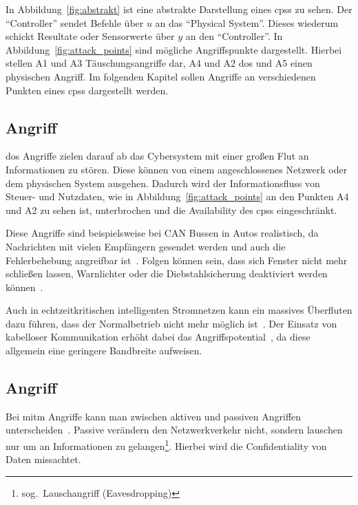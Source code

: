\documentclass[final,bibliography=totocnumbered]{include/sikseminar}
\newcommand{\cps}{\glspl{cps}\xspace}
\begin{document}
In Abbildung~\ref{fig:abstrakt} ist eine abstrakte Darstellung eines \cps zu sehen.
Der \enquote{Controller} sendet Befehle über $u$ an das \enquote{Physical System}.
Dieses wiederum schickt Resultate oder Sensorwerte über $y$ an den \enquote{Controller}.
In Abbildung~\ref{fig:attack_points} sind mögliche Angriffspunkte dargestellt.
Hierbei stellen A1 und A3 Täuschungsangriffe dar, A4 und A2 \gls{dos} und A5 einen physischen Angriff.
Im folgenden Kapitel sollen Angriffe an verschiedenen Punkten eines \cps dargestellt werden.


\subsection{ Angriff}\label{subsec:dos}
\gls{dos} Angriffe zielen darauf ab das Cybersystem mit einer großen Flut an Informationen zu stören.
Diese können von einem angeschlossenes Netzwerk oder dem physischen System ausgehen.
Dadurch wird der Informationsfluss von Steuer- und Nutzdaten, wie in Abbildung~\ref{fig:attack_points} an den Punkten A4 und A2 zu sehen ist, unterbrochen und die Availability des \cps eingeschränkt.

Diese Angriffe sind beispielsweise bei CAN Bussen in Autos realistisch, da Nachrichten mit vielen Empfängern gesendet werden und auch die Fehlerbehebung angreifbar ist~\cite{KCR+10,CDV13}.%
Folgen können sein, dass sich Fenster nicht mehr schließen lassen, Warnlichter oder die Diebstahlsicherung deaktiviert werden können~\cite{HKD08}.

Auch in echtzeitkritischen intelligenten Stromnetzen kann ein massives Überfluten dazu führen, dass der Normalbetrieb nicht mehr möglich ist~\cite{LLW+10}.
Der Einsatz von kabelloser Kommunikation erhöht dabei das Angriffspotential~\cite{LWW11}, da diese allgemein eine geringere Bandbreite aufweisen.

\subsection{ Angriff}\label{subsec:mitm}
Bei \gls{mitm} Angriffe kann man zwischen aktiven und passiven Angriffen unterscheiden~\cite{WYX+10}.
Passive verändern den Netzwerkverkehr nicht, sondern lauschen nur um an Informationen zu gelangen\footnote{sog.\ Lauschangriff (Eavesdropping)}.
Hierbei wird die Confidentiality von Daten missachtet.
\end{document}
